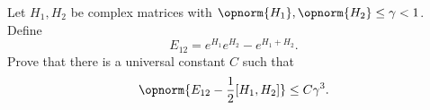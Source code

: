 Let $H_1,H_2$ be complex matrices with $\opnorm{H_1},\opnorm{H_2}\leq\gamma<1$.  Define
$$
    E_{12}=e^{H_1}e^{H_2}-e^{H_1+H_2}.
$$
Prove that there is a universal constant $C$ such that
$$
    \opnorm{E_{12}-\frac12[H_1,H_2]}\leq C\gamma^3.
$$
